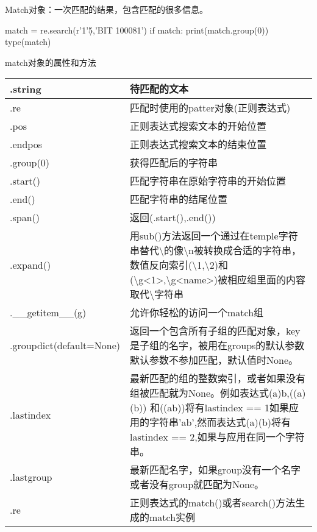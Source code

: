 Match对象：一次匹配的结果，包含匹配的很多信息。
\begin{python}
match = re.search(r'1'\d{5},'BIT 100081')
if match:
    print(match.group(0))
type(match)
\end{python}
match对象的属性和方法
\begin{center}
\begin{tabular}{|p{4.2cm}|p{10cm}|}
\hline
.string&待匹配的文本\\
\hline
.re&匹配时使用的patter对象(正则表达式)\\
\hline
.pos&正则表达式搜索文本的开始位置\\
\hline
.endpos&正则表达式搜索文本的结束位置\\
\hline
.group(0)&获得匹配后的字符串\\
\hline
.start()&匹配字符串在原始字符串的开始位置\\
\hline
.end()&匹配字符串的结尾位置\\
\hline
.span()&返回(.start(),.end())\\
\hline
.expand()&用sub()方法返回一个通过在temple字符串替代\textbackslash 的像\textbackslash n被转换成合适的字符串，数值反向索引(\textbackslash 1,\textbackslash 2)和(\textbackslash g<1>,\textbackslash g<name>)被相应组里面的内容取代\textbackslash 字符串\\
\hline
.\_\_getitem\_\_(g)&允许你轻松的访问一个match组\\
\hline
.groupdict(default=None)&返回一个包含所有子组的匹配对象，key是子组的名字，被用在groups的默认参数
默认参数不参加匹配，默认值时None。\\
\hline
.lastindex&最新匹配的组的整数索引，或者如果没有组被匹配就为None。例如表达式(a)b,((a)(b))
和((ab))将有lastindex == 1如果应用的字符串'ab',然而表达式(a)(b)将有lastindex == 2,如果与应用在同一个字符串。\\
\hline
.lastgroup&最新匹配名字，如果group没有一个名字或者没有group就匹配为None。\\
\hline
.re&正则表达式的match()或者search()方法生成的match实例\\
\hline
\end{tabular}
\end{center}


